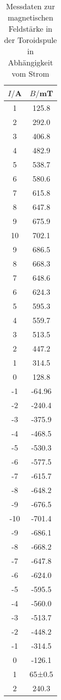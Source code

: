 \begin{table}
  \centering
  \caption{Messdaten zur magnetischen Feldstärke in der Toroidspule in Abhängigkeit
  vom Strom}
  \label{tab:hysterese}
  \begin{tabular}{c c}
    \toprule
    $I/$A & $B/$mT\\
    \midrule
    1	  &  125.8\\
    2	  &  292.0\\
    3	  &  406.8\\
    4	  &  482.9\\
    5	  &  538.7\\
    6	  &  580.6\\
    7	  &  615.8\\
    8	  &  647.8\\
    9	  &  675.9\\
    10	&  702.1\\
    9	  &  686.5\\
    8	  &  668.3\\
    7	  &  648.6\\
    6	  &  624.3\\
    5	  &  595.3\\
    4	  &  559.7\\
    3	  &  513.5\\
    2	  &  447.2\\
    1	  &  314.5\\
    0	  &  128.8\\
    -1	&  -64.96\\
    -2	&  -240.4\\
    -3	&  -375.9\\
    -4	&  -468.5\\
    -5	&  -530.3\\
    -6	&  -577.5\\
    -7	&  -615.7\\
    -8	&  -648.2\\
    -9	&  -676.5\\
    -10	&  -701.4\\
    -9	&  -686.1\\
    -8	&  -668.2\\
    -7	&  -647.8\\
    -6	&  -624.0\\
    -5	&  -595.5\\
    -4	&  -560.0\\
    -3	&  -513.7\\
    -2	&  -448.2\\
    -1	&  -314.5\\
    0	  &  -126.1\\
    1	  &  65±0.5\\
    2	  &  240.3\\
    \bottomrule
  \end{tabular}
\end{table}

